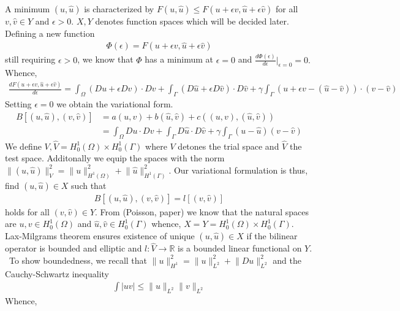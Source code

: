 \documentclass[11pt, norsk, a4paper]{article}
\newcommand\norm[1]{\lVert#1\rVert}
\begin{document}
A minimum $(u, \hat{u})$ is characterized by $F(u, \hat{u}) \leq F(u+\epsilon v, \hat{u}+\epsilon \hat{v}) $ for all $v, \hat{v} \in Y$ and $\epsilon > 0$. $X, Y$ denotes function spaces which will be decided later. Defining a new function 
\begin{align*}
    \Phi(\epsilon) = F(u+\epsilon v, \hat{u}+\epsilon \hat{v})
\end{align*}
still requiring $\epsilon > 0$, we know that $\Phi$ has a minimum at $\epsilon = 0$ and 
$
\frac{d\Phi(\epsilon)}{d\epsilon} |_{\epsilon =0 } = 0.
$
Whence, 
\begin{align*}
    \frac{dF(u+\epsilon v, \hat{u}+\epsilon\hat{v})}{d\epsilon} = \int_\Omega (Du+\epsilon Dv)\cdot Dv+\int_\Gamma (D\hat{u}+\epsilon D\hat{v})\cdot D\hat{v} + \gamma \int_\Gamma (u+\epsilon v -(\hat{u}-\hat{v}))\cdot (v-\hat{v})
\end{align*}
Setting $\epsilon = 0$ we obtain the variational form. 
\begin{align*}
   B[(u,\hat{u}), (v, \hat{v})] &= a(u, v) + b(\hat{u}, \hat{v}) + c((u,v), (\hat{u},\hat{v}))  \\
   &=   \int_\Omega Du\cdot Dv +\int_\Gamma D\hat{u}\cdot D\hat{v} +\gamma \int_\Gamma (u-\hat{u})(v-\hat{v})
\end{align*}
We define $V, \hat{V} = H^1_0(\Omega)\times H^1_0(\Gamma)$ where $V$ detones the trial space and $\hat{V}$ the test space. Additonally we equip the spaces with the norm $\norm{(u,\hat{u})}^2_V = \norm{u}_{H^1(\Omega)}^2+\norm{\hat{u}}_{H^1(\Gamma)}^2$. 
Our variational formulation is thus, find $(u,\hat{u}) \in X$ such that 
\begin{align*}
    B[(u, \hat{u}), (v, \hat{v})] = l[(v, \hat{v})] 
\end{align*}
holds for all $(v, \hat{v}) \in Y$. From (Poisson, paper) we know that the natural spaces are $u, v \in H^1_0(\Omega)$ and $\hat{u}, \hat{v} \in H^1_0(\Gamma)$ whence, $X = Y = H^1_0(\Omega) \times H^1_0(\Gamma)$.  Lax-Milgrams theorem ensures existence of unique $(u,\hat{u}) \in X$ if the bilinear operator is bounded and elliptic and $l: \hat{V} \to \mathbb{R}$ is a bounded linear functional on $Y$. 
\ 
To show boundedness, we recall that $\norm{u}^2_{H^1} = \norm{u}^2_{L^2} + \norm{Du}^2_{L^2}$ and the Cauchy-Schwartz inequality 
\begin{align*}
    \int |uv| \leq \norm{u}_{L^2}\norm{v}_{L^2}
\end{align*}
Whence, 
\end{document}
